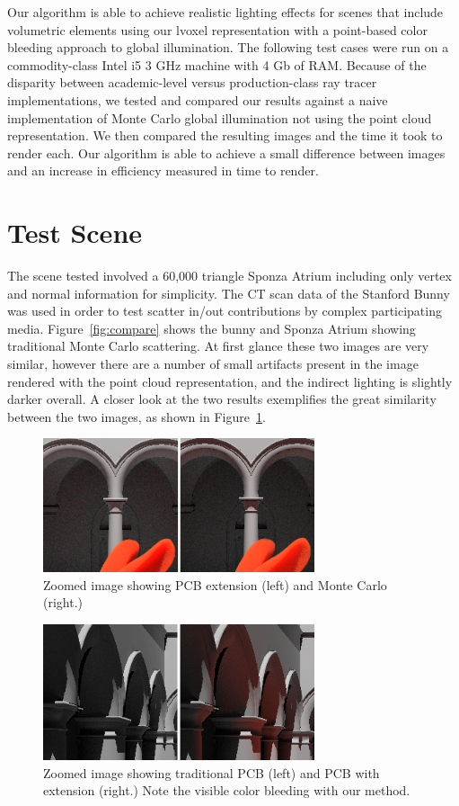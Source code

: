 \documentclass[12pt]{ucthesis}
\begin{document}
Our algorithm is able to achieve realistic lighting effects for scenes that include volumetric elements using our lvoxel representation with a point-based color bleeding approach to global illumination.
The following test cases were run on a commodity-class Intel i5 3 GHz machine with 4 Gb of RAM.  Because of the disparity between academic-level versus production-class ray tracer implementations, we tested and compared our results against a naive implementation of Monte Carlo global illumination not using the point cloud representation.  We then compared the resulting images and the time it took to render each.  Our algorithm is able to achieve a small difference between images and an increase in efficiency measured in time to render.

\section{Test Scene}

The scene tested involved a 60,000 triangle Sponza Atrium including only vertex and normal information for simplicity.  The CT scan data of the Stanford Bunny was used in order to test scatter in/out contributions by complex participating media.
Figure~\ref{fig:compare} shows the bunny and Sponza Atrium showing traditional Monte Carlo scattering.  At first glance these two images are very similar, however there are a number of small artifacts present in the image rendered with the point cloud representation, and the indirect lighting is slightly darker overall.  A closer look at the two results exemplifies the great similarity between the two images, as shown in Figure~\ref{fig:compare_close}.

\begin{figure}[h!]
    \centering
    \includegraphics[width=80mm]{img/compare1_corrected.png}
    \caption{Zoomed image showing PCB extension (left) and Monte Carlo (right.)}
    \label{fig:compare_close}
\end{figure}

\begin{figure}[h!]
    \centering
    \includegraphics[width=80mm]{img/compare_trad_corrected.png}
    \caption{Zoomed image showing traditional PCB (left) and PCB with extension (right.)  Note the visible color bleeding with our method.}
    \label{fig:compare_trad}
\end{figure}
\end{document}
